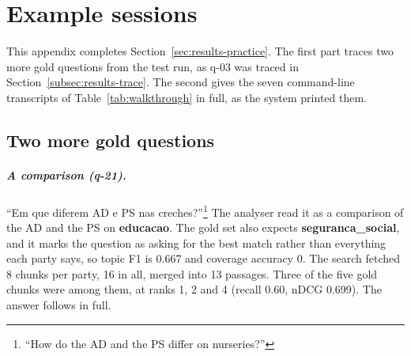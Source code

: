 \chapter{Example sessions} \label{app:examples}

This appendix completes Section~\ref{sec:results-practice}. The first part
traces two more gold questions from the test run, as q-03 was traced in
Section~\ref{subsec:results-trace}. The second gives the seven command-line
transcripts of Table~\ref{tab:walkthrough} in full, as the system printed
them.

\section{Two more gold questions} \label{sec:app-traces}

\paragraph{A comparison (q-21).} ``Em que diferem AD e PS nas
creches?''\footnote{``How do the AD and the PS differ on nurseries?''} The
analyser read it as a comparison of the AD and the PS on \textbf{educacao}.
The gold set also expects \textbf{seguranca\_social}, and it marks the
question as asking for the best match rather than everything each party says,
so topic F1 is 0.667 and coverage accuracy 0. The search fetched 8 chunks
per party, 16 in all, merged into 13 passages.
Three of the five gold chunks were among them, at ranks 1, 2 and 4 (recall
0.60, nDCG 0.699). The answer follows in full.

